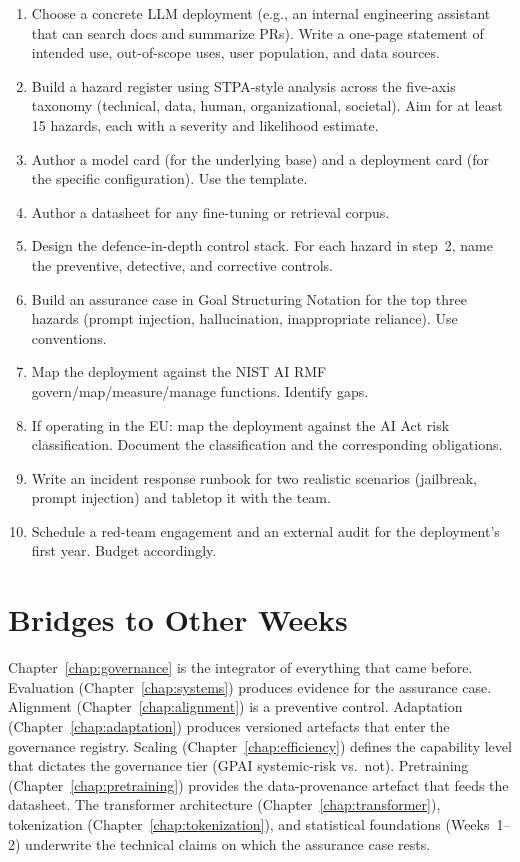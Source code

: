\begin{enumerate}
  \item Choose a concrete LLM deployment (e.g., an internal
        engineering assistant that can search docs and summarize
        PRs). Write a one-page statement of intended use,
        out-of-scope uses, user population, and data sources.
  \item Build a hazard register using STPA-style analysis across
        the five-axis taxonomy (technical, data, human,
        organizational, societal). Aim for at least 15 hazards,
        each with a severity and likelihood estimate.
  \item Author a model card (for the underlying base) and a
        deployment card (for the specific configuration). Use
        the \citet{mitchell2019modelcards} template.
  \item Author a datasheet \citep{gebru2021datasheets} for any
        fine-tuning or retrieval corpus.
  \item Design the defence-in-depth control stack. For each
        hazard in step~2, name the preventive, detective, and
        corrective controls.
  \item Build an assurance case in Goal Structuring Notation for
        the top three hazards (prompt injection, hallucination,
        inappropriate reliance). Use \citet{gsn2021}
        conventions.
  \item Map the deployment against the NIST AI RMF
        \citep{nist2023airmf} govern/map/measure/manage
        functions. Identify gaps.
  \item If operating in the EU: map the deployment against the
        AI Act \citep{eu_aiact_2024} risk classification.
        Document the classification and the corresponding
        obligations.
  \item Write an incident response runbook for two realistic
        scenarios (jailbreak, prompt injection) and tabletop it
        with the team.
  \item Schedule a red-team engagement and an external audit for
        the deployment's first year. Budget accordingly.
\end{enumerate}

\section{Bridges to Other Weeks}

Chapter~\ref{chap:governance} is the integrator of everything that came before.
Evaluation (Chapter~\ref{chap:systems}) produces evidence for the assurance case.
Alignment (Chapter~\ref{chap:alignment}) is a preventive control. Adaptation (Chapter~\ref{chap:adaptation})
produces versioned artefacts that enter the governance registry.
Scaling (Chapter~\ref{chap:efficiency}) defines the capability level that dictates the
governance tier (GPAI systemic-risk vs.\ not).
Pretraining (Chapter~\ref{chap:pretraining}) provides the data-provenance artefact that
feeds the datasheet. The transformer architecture (Chapter~\ref{chap:transformer}),
tokenization (Chapter~\ref{chap:tokenization}), and statistical foundations (Weeks~1--2)
underwrite the technical claims on which the assurance case
rests.

